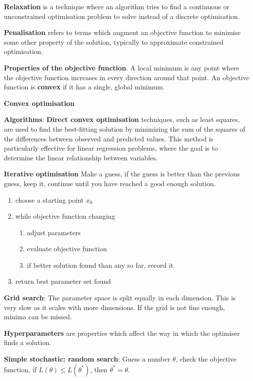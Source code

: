 \documentclass{article}
\begin{document}
\textbf{Relaxation} is a technique where an algorithm tries to find a continuous or unconstrained
optimisation problem to solve instead of a discrete optimisation.

\textbf{Penalisation} refers to terms which augment an objective function to minimise some other property of
the solution, typically to approximate constrained optimisation.

\textbf{Properties of the objective function}. A local minimum is any point where the objective function
increases in every direction around that point. An objective function is \textbf{convex} if it has a single, global minimum.

\textbf{Convex optimisation}

\textbf{Algorithms}:
\textbf{Direct convex optimisation} techniques, such as least squares,
are used to find the best-fitting solution by minimizing the sum of the squares of the differences
between observed and predicted values. This method is particularly effective for linear regression
problems, where the goal is to determine the linear relationship between variables.

\textbf{Iterative optimisation}
Make a guess, if the guess is better than the previous guess, keep it, continue until you have reached a good enough solution.
\begin{enumerate}
    \item choose a starting point $x_0$
    \item while objective function changing
    \begin{enumerate}
        \item adjust parameters
        \item evaluate objective function
        \item if better solution found than any so far, record it
    \end{enumerate}
    \item return best parameter set found
\end{enumerate}

\textbf{Grid search}: The parameter space is split equally in each dimension.
This is very slow as it scales with more dimensions.
If the grid is not fine enough, minima can be missed.

\textbf{Hyperparameters} are properties which affect the way in which the optimiser finds a solution.

\textbf{Simple stochastic: random search}: Guess a number $\theta$, check the objective function,
if $L(\theta) \le L(\theta^*)$, then $\theta^* = \theta$.
\end{document}
